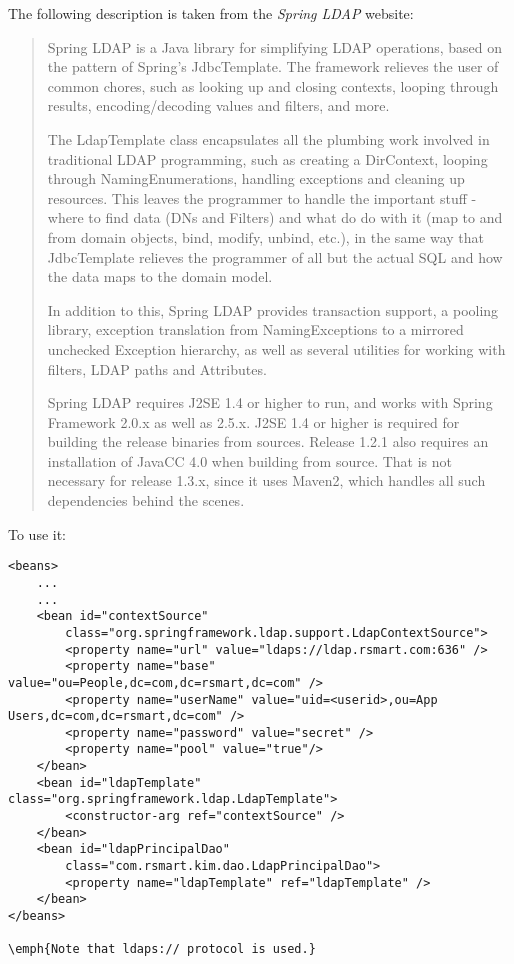 \documentclass[12pt,notitlepage]{article}
\begin{document}
The following description is taken from the \emph{Spring LDAP} website:
\begin{quote}
Spring LDAP is a Java library for simplifying LDAP operations, based on the pattern of Spring's JdbcTemplate. The framework relieves the user of common chores, such as looking up and closing contexts, looping through results, encoding/decoding values and filters, and more.

The LdapTemplate class encapsulates all the plumbing work involved in traditional LDAP programming, such as creating a DirContext, looping through NamingEnumerations, handling exceptions and cleaning up resources. This leaves the programmer to handle the important stuff - where to find data (DNs and Filters) and what do do with it (map to and from domain objects, bind, modify, unbind, etc.), in the same way that JdbcTemplate relieves the programmer of all but the actual SQL and how the data maps to the domain model.

In addition to this, Spring LDAP provides transaction support, a pooling library, exception translation from NamingExceptions to a mirrored unchecked Exception hierarchy, as well as several utilities for working with filters, LDAP paths and Attributes.

Spring LDAP requires J2SE 1.4 or higher to run, and works with Spring Framework 2.0.x as well as 2.5.x. J2SE 1.4 or higher is required for building the release binaries from sources. Release 1.2.1 also requires an installation of JavaCC 4.0 when building from source. That is not necessary for release 1.3.x, since it uses Maven2, which handles all such dependencies behind the scenes.
\end{quote}

To use it:
\begin{lstlisting}[caption=spring-datasource.xml]
<beans>
    ...
    ...
    <bean id="contextSource"
        class="org.springframework.ldap.support.LdapContextSource">
        <property name="url" value="ldaps://ldap.rsmart.com:636" />
        <property name="base" value="ou=People,dc=com,dc=rsmart,dc=com" />
        <property name="userName" value="uid=<userid>,ou=App Users,dc=com,dc=rsmart,dc=com" />
        <property name="password" value="secret" />
        <property name="pool" value="true"/>
    </bean>
    <bean id="ldapTemplate" class="org.springframework.ldap.LdapTemplate">
        <constructor-arg ref="contextSource" />
    </bean>
    <bean id="ldapPrincipalDao"
        class="com.rsmart.kim.dao.LdapPrincipalDao">
        <property name="ldapTemplate" ref="ldapTemplate" />
    </bean>
</beans>

\emph{Note that ldaps:// protocol is used.}

\end{lstlisting}
\end{document}
